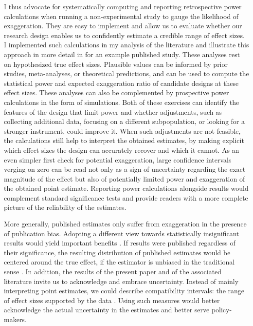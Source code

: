 \documentclass[12pt]{article}
\begin{document}
	I thus advocate for systematically computing and reporting retrospective power calculations when running a non-experimental study to gauge the likelihood of exaggeration. They are easy to implement and allow us to evaluate whether our research design enables us to confidently estimate a credible range of effect sizes. I implemented such calculations in my analysis of the literature and illustrate this approach in more detail in  for an example published study. These analyses rest on hypothesized true effect sizes. Plausible values can be informed by prior studies, meta-analyses, or theoretical predictions, and can be used to compute the statistical power and expected exaggeration ratio of candidate designs at these effect sizes. These analyses can also be complemented by prospective power calculations in the form of simulations. Both of these exercises can identify the features of the design that limit power and whether adjustments, such as collecting additional data, focusing on a different subpopulation, or looking for a stronger instrument, could improve it. When such adjustments are not feasible, the calculations still help to interpret the obtained estimates, by making explicit which effect sizes the design can accurately recover and which it cannot. As an even simpler first check for potential exaggeration, large confidence intervals verging on zero can be read not only as a sign of uncertainty regarding the exact magnitude of the effect but also of potentially limited power and exaggeration of the obtained point estimate. %
	Reporting power calculations alongside results would complement standard significance tests and provide readers with a more complete picture of the reliability of the estimates. 
	
	More generally, published estimates only suffer from exaggeration in the presence of publication bias. Adopting a different view towards statistically insignificant results would yield important benefits \citep{ziliak_cult_2008, wasserstein_asa_2016, mcshane_abandon_2019}. If results were published regardless of their significance, the resulting distribution of published estimates would be centered around the true effect, if the estimator is unbiased in the traditional sense \citep{hernan_causal_2022}. In addition, the results of the present paper and of the associated literature invite us to acknowledge and embrace uncertainty. Instead of mainly interpreting point estimates, we could describe compatibility intervals: the range of effect sizes supported by the data \citep{amrhein_inferential_2019, romer2020praise}. Using such measures would better acknowledge the actual uncertainty in the estimates and better serve policy-makers.
\end{document}

